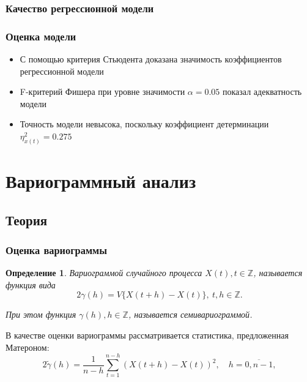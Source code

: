 \documentclass[10pt, pdf,aspectratio=169]{beamer}
\newtheorem{ru_def}{Определение}
\renewenvironment{Definition}{\begin{ru_def}}{\end{ru_def}}
\begin{document}
\subsubsection{Качество регрессионной модели}
\begin{frame}
  \frametitle{Оценка модели}   %
  \begin{itemize}
    \item С помощью критерия Стьюдента доказана значимость коэффициентов регрессионной модели
    \item F-критерий Фишера при уровне значимости $ \alpha = 0.05 $ показал адекватность модели
    \item Точность модели невысока, поскольку коэффициент детерминации $ \eta^2_{x(t)} = 0.275 $
  \end{itemize}
\end{frame}



\section{Вариограммный анализ}

\subsection{Теория}

\begin{frame}
  \frametitle{Оценка вариограммы}   %
  \begin{Definition}
    \textit{Вариограммой} случайного процесса $ X(t), t \in \mathbb{Z} $, называется функция вида
    \begin{equation}
        2 \gamma (h) = V \{ X(t + h) - X(t) \},~ t, h \in \mathbb{Z}.
    \end{equation}

    При этом функция $ \gamma (h), h \in \mathbb{Z} $, называется \textit{семивариограммой}.
  \end{Definition}
  В качестве оценки вариограммы рассматривается статистика, предложенная Матероном:
  \begin{equation}
    2 \tilde{\gamma}(h) = \frac{1}{n - h} \sum_{t = 1}^{n - h}(X(t + h) - X(t))^2, \quad h = \overline{0, n - 1},
  \end{equation}
\end{frame}
\end{document}
